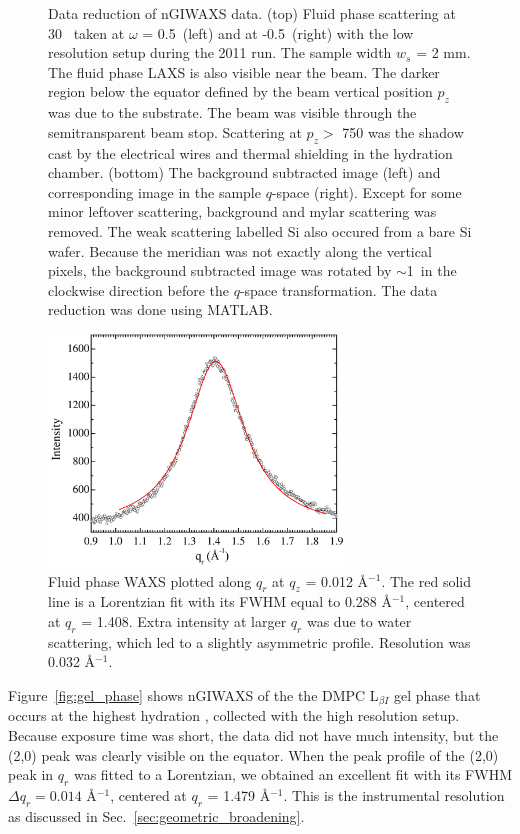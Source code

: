 \begin{figure}[htbp]
  {Data reduction of nGIWAXS data. (top) Fluid phase scattering at
  30 \textcelsius\ taken at $\omega$ = 0.5\textdegree\ (left) 
  and at -0.5\textdegree\ (right) with the low resolution setup during the 
  2011 run. The sample width $w_s$ = 2 mm.
  The fluid phase LAXS is also visible near the beam.  
  The darker region below the equator defined by 
  the beam vertical position $p_z$ was due to the substrate. The beam
  was visible through the semitransparent beam stop.
  Scattering at $p_z >$ 750 was the shadow cast by the electrical wires 
  and thermal shielding in the hydration chamber.
  (bottom) The background subtracted 
  image (left) and corresponding image in the sample $q$-space (right).
  Except for some minor leftover scattering, background and mylar scattering was 
  removed. The weak scattering labelled Si also occured from a bare Si wafer.  
  Because the meridian was not exactly along the vertical
  pixels, the background subtracted image was rotated by $\sim$1\textdegree\
  in the clockwise direction before the $q$-space transformation. The data
  reduction was done using MATLAB.}
  \label{fig:waxs_data_reduction}
\end{figure}

\begin{figure}[htbp]
  \centering
  \includegraphics[width=0.7\textwidth]{figures/ripple/nGIWAXS/fluid_qr}
  \caption{Fluid phase WAXS plotted along $q_r$ at $q_z$ = 0.012 \AA$^{-1}$.
  The red solid line is a Lorentzian fit with its FWHM equal to 0.288 \AA$^{-1}$,
  centered at $q_r$ = 1.408. Extra intensity at larger $q_r$ was due to
  water scattering, which led to a slightly asymmetric profile.  
  Resolution was 0.032 \AA$^{-1}$.}
  \label{fig:fluid_qr}
\end{figure}

Figure~\ref{fig:gel_phase} shows nGIWAXS of the the DMPC L$_{\beta I}$ gel phase
that occurs at the highest hydration \cite{ref:Smith88,Tristram-Nagle02},
collected with the high resolution setup. Because exposure time was short,
the data did not have much intensity, but the (2,0) peak was clearly 
visible on the equator.
When the peak profile of the (2,0) peak in $q_r$ was fitted to a Lorentzian, 
we obtained an excellent fit with its FWHM $\Delta q_r = 0.014$ \AA$^{-1}$,
centered at $q_r$ = 1.479 \AA$^{-1}$.
This is the instrumental resolution as discussed in Sec.~\ref{sec:geometric_broadening}. 

